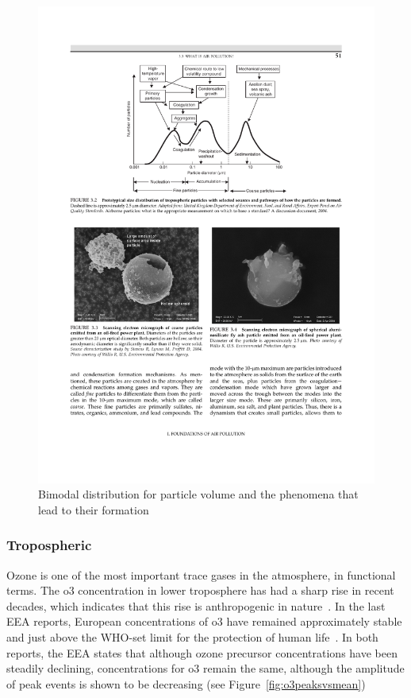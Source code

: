 \begin{figure}[htpb]
    \centering
    \includegraphics[clip,%
    trim=5.5cm 19.1cm 5.5cm 3.5cm,%
    width=.8\textwidth]{img/pdf/vallero_bimodal_particles.pdf}
    \caption{Bimodal distribution for particle volume and the phenomena
    that lead to their formation~\cite{Vallero2014}}
    \label{fig:particle_distribution}
\end{figure}


\subsubsection{Tropospheric }%
\label{ssub:tropospheric_o3}

Ozone is one of the most important trace gases in the atmosphere, in
functional terms.  The \gls{o3} concentration in lower troposphere has
had a sharp rise in recent decades, which indicates that this rise is
anthropogenic in nature~\cite{Bourdeau}.  In the last \gls{EEA} reports,
European concentrations of \gls{o3} have remained approximately stable
and just above the \gls{WHO}-set limit for the protection of human
life~\cite{EEA2016, Guerreiro2019}. In both reports, the \gls{EEA}
states that although ozone precursor concentrations have been steadily
declining, concentrations for \gls{o3} remain the same, although the
amplitude of peak events is shown to be decreasing (see
Figure~\ref{fig:o3peaksvsmean})


